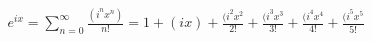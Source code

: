 \documentclass[preview]{standalone}
\begin{document}
\begin{align*}
e^{ix} = \sum_{n=0}^{\infty} \frac{(i^nx^n)}{n!} = 1 + (ix) + \frac{(i^2x^2}{2!} + \frac{(i^3x^3}{3!} + \frac{(i^4x^4}{4!} + \frac{(i^5x^5}{5!} \\
\end{align*}
\end{document}
